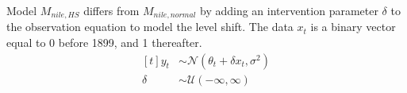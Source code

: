 \documentclass{article}
\newcommand{\paren}[1]{\ensuremath{\left(#1\right)}}
\newcommand{\dnorm}[1]{\ensuremath{\mathcal{N}\paren{#1}}}
\newcommand{\dunif}[1]{\ensuremath{\mathcal{U}\paren{#1}}}
\begin{document}
Model $M_{nile,HS}$ differs from $M_{nile,normal}$ by adding an intervention parameter $\delta$ to the observation equation to model the level shift. 
The data $x_{t}$ is a binary vector equal to 0 before 1899, and 1 thereafter.
\begin{equation}
  \label{eq:19}
  \begin{aligned}[t]
    y_{t} &\sim \dnorm{\theta_{t} + \delta x_{t}, \sigma^{2}} \\
    \delta &\sim \dunif{-\infty, \infty}
  \end{aligned}
\end{equation}

\clearpage{}

\printbibliography{}
\end{document}
